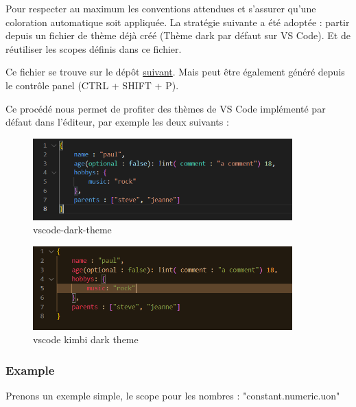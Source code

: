 \documentclass[
    iict, %
    il, %
]{heig-tb}
\begin{document}
Pour respecter au maximum les conventions attendues et s'assurer qu'une coloration automatique soit appliquée. La stratégie suivante a été adoptée : partir depuis un fichier de thème déjà créé (Thème dark par défaut sur VS Code). 
Et de réutiliser les scopes définis dans ce fichier.

Ce fichier se trouve sur le dépôt \href{https://github.com/microsoft/vscode/blob/main/extensions/theme-defaults/themes/dark_vs.json}{suivant}.
Mais peut être également généré depuis le contrôle panel (CTRL + SHIFT + P).

Ce procédé nous permet de profiter des thèmes de VS Code implémenté par défaut dans l'éditeur, par exemple les deux suivants :

\begin{figure}[!h]
    \begin{center}
        \includegraphics[width=10cm]{assets/figures/vscode-dark-theme.PNG}
    \end{center}
    \caption[vscode dark theme]{\label{vscode-dark-theme} vscode-dark-theme}
\end{figure}


\begin{figure}[!h]
    \begin{center}
        \includegraphics[width=10cm]{assets/figures/vscode-kimbi-dark-theme.PNG}
    \end{center}
    \caption[vscode kimbi dark theme]{\label{vscode-kimbi-dark-theme} vscode kimbi dark theme}
\end{figure}

\subsubsection{Example}
Prenons un exemple simple, le scope pour les nombres : "constant.numeric.uon"
\end{document}
